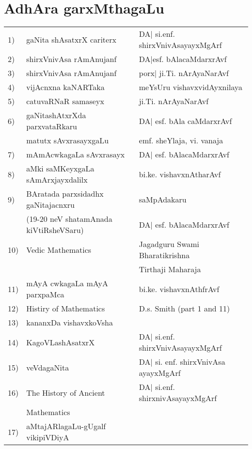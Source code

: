 \chapter{AdhAra garxMthagaLu}


\begin{longtable}{l>{\raggedright}p{4cm}>{\raggedright}p{4cm}}
{\rm 1)} &  gaNita shAsatxrX cariterx & DA| si.enf. shirxVnivAsayayxMgArf \tabularnewline
{\rm 2)} & shirxVnivAsa rAmAnujanf & DA|esf. bAlacaMdarxrAvf\tabularnewline
{\rm 3)} & shirxVnivAsa rAmAnujanf & porx| ji.Ti. nArAyaNarAvf\tabularnewline
{\rm 4)} & vijAcnxna kaNARTaka & meYsUru vishavxvidAyxnilaya\tabularnewline
{\rm 5)} & catuvaRNaR samaseyx & ji.Ti. nArAyaNarAvf\tabularnewline
{\rm 6)} & gaNitashAtxrXda parxvataRkaru & DA| esf. bAla caMdarxrAvf\tabularnewline[-0.1cm]
& matutx sAvxrasayxgaLu & emf. sheYlaja, vi. vanaja\tabularnewline
{\rm 7)} & mAmAcwkagaLa sAvxrasayx & DA| esf. bAlacaMdarxrAvf\tabularnewline
{\rm 8)} & aMki saMKeyxgaLa sAmArxjayxdalilx & bi.ke. vishavxnAtharAvf\tabularnewline
{\rm 9)} & BAratada parxsidadhx gaNitajacnxru  & saMpAdakaru \tabularnewline[-0.1cm]
& ({\rm 19-20} neV shatamAnada kiVtiRsheVSaru) & DA| esf. bAlacaMdarxrAvf\tabularnewline
{\rm 10)} & {\rm Vedic Mathematics} & {\rm Jagadguru Swami Bharatikrishna}\tabularnewline[0.1cm] 
&& {\rm  Tirthaji Maharaja}\tabularnewline
{\rm 11)} & mAyA cwkagaLa mAyA parxpaMca & bi.ke. vishavxnAthfrAvf\tabularnewline
{\rm 12)} & {\rm Histiry of Mathematics} & {\rm D.s. Smith (part 1 and 11)}\tabularnewline
{\rm 13)} & kananxDa vishavxkoVsha &\tabularnewline
{\rm 14)} & KagoVLashAsatxrX & DA| si.enf. shirxVnivAsayayxMgArf\tabularnewline
{\rm 15)} & veVdagaNita & DA| si. enf. shirxVnivAsa ayayxMgArf\tabularnewline
{\rm 16)} & {\rm The History of Ancient} & DA| si.enf. shirxnivAsayayxMgArf\tabularnewline[-0.1cm]
& {\rm Mathematics}& \tabularnewline
{\rm 17)} & aMtajARlagaLu-gUgalf vikipiVDiyA & \tabularnewline
\end{longtable}

